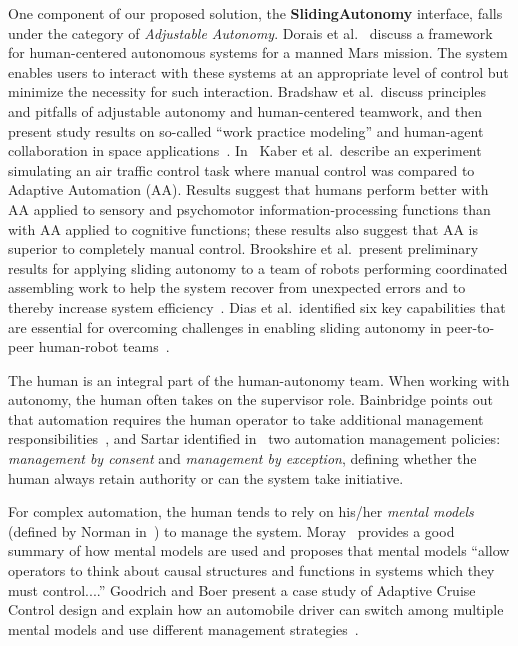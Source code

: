 One component of our proposed solution, the \textbf{SlidingAutonomy} interface, falls under the category of \textit{Adjustable Autonomy}. Dorais et al.\ \cite{Dorais1998AdjustableAutonomy} discuss a framework for human-centered autonomous systems for a manned Mars mission. The system enables users to interact with these systems at an appropriate level of control but minimize the necessity for such interaction. Bradshaw et al.\ discuss principles and pitfalls of adjustable autonomy and human-centered teamwork, and then present study results on so-called ``work practice modeling'' and human-agent collaboration in space applications~\cite{Bradshaw2003AdjustableAutonomy}. In~\cite{Kaber2005Adaptive} Kaber et al.\ describe an experiment simulating an air traffic control task where manual control was compared to Adaptive Automation (AA). Results suggest that humans perform better with AA applied to sensory and psychomotor information-processing functions than with AA applied to cognitive functions; these results also suggest that AA is superior to completely manual control. Brookshire et al.\ present preliminary results for applying sliding autonomy to a team of robots performing coordinated assembling work to help the system recover from unexpected errors and to thereby increase system efficiency~\cite{Brookshire2004Preliminary}. Dias et al.\ identified six key capabilities that are essential for overcoming challenges in enabling sliding autonomy in peer-to-peer human-robot teams~\cite{Dias2008SlidingAutonomy}.

The human is an integral part of the human-autonomy team. When working with autonomy, the human often takes on the supervisor role. Bainbridge points out that automation requires the human operator to take additional management responsibilities~\cite{Bainbridge1983Ironies}, and Sartar identified in~\cite{Sarter1998Making} two automation management policies: \textit{management by consent} and \textit{management by exception}, defining whether the human always retain authority or can the system take initiative. 

For complex automation, the human tends to rely on his/her \textit{mental models} (defined by Norman in~\cite{Norman1983Some}) to manage the system. Moray~\cite{Moray1999Mental} provides a good summary of how mental models are used and proposes that mental models ``allow operators to think about causal structures and functions in systems which they must control....'' Goodrich and Boer present a case study of Adaptive Cruise Control design and explain how an automobile driver can switch among multiple mental models and use different management strategies~\cite{Goodrich2002Multiple, Goodrich2003Model}. 

